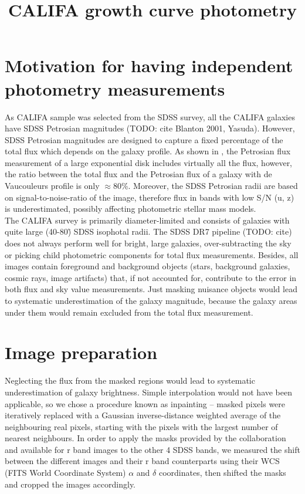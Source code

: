 \documentclass[apj, onecolumn]{emulateapj}
\title{CALIFA growth curve photometry}
\begin{document}
\maketitle
\section*{Motivation for having independent photometry measurements}

As CALIFA sample was selected from the SDSS survey, all the CALIFA galaxies have SDSS Petrosian magnitudes  (TODO: cite Blanton 2001, Yasuda). However, SDSS Petrosian magnitudes are designed to capture a fixed percentage of the total flux which depends on the galaxy profile. As shown in \cite{Blanton2001}, the Petrosian flux measurement of a large exponential disk includes virtually all the flux, however, the ratio between the total flux and the Petrosian flux of a galaxy with de Vaucouleurs profile is only $\approx$80\%. Moreover, the SDSS Petrosian radii are based on signal-to-noise-ratio of the image, therefore flux in bands with low S/N (u, z) is underestimated, possibly affecting photometric stellar mass models.\\

The CALIFA survey is primarily diameter-limited and consists of galaxies with quite large (40-80\") SDSS isophotal radii. The SDSS DR7 pipeline (TODO: cite) does not always perform well for bright, large galaxies, over-subtracting the sky or picking child photometric components for total flux measurements. Besides, all images contain foreground and background objects (stars, background galaxies, cosmic rays, image artifacts) that, if not accounted for, contribute to the error in both flux and sky value measurements. Just masking nuisance objects would lead to systematic underestimation of the galaxy magnitude, because the galaxy areas under them would remain excluded from the total flux measurement.

\section*{Image preparation}
Neglecting the flux from the masked regions would lead to systematic underestimation of galaxy brightness. Simple interpolation would not have been applicable, so we chose a procedure known as inpainting -- masked pixels were iteratively replaced with a Gaussian inverse-distance weighted average of the neighbouring real pixels, starting with the pixels with the largest number of nearest neighbours. In order to apply the masks provided by the collaboration and available for r band images to the other 4 SDSS bands, we measured the shift between the different images and their r band counterparts using their WCS (FITS World Coordinate System) $\alpha$ and $\delta$ coordinates, then shifted the masks and cropped the images accordingly.
\end{document}
